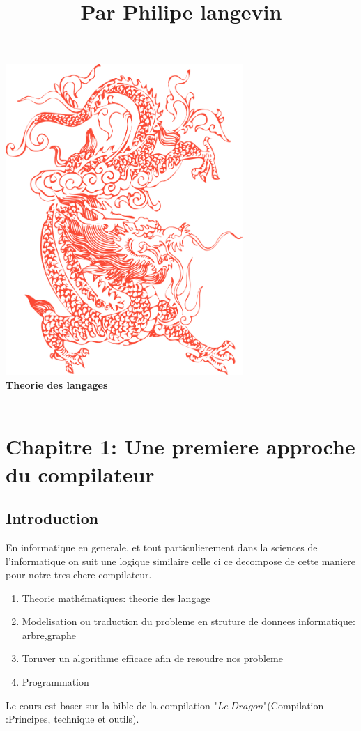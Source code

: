 \documentclass[a4paper,11pt]{article}
\title{\color{OrangeHaf} Par Philipe langevin}
\date{}
\begin{document}
\pagecolor{BlackHaf}
     \begin{center}
     \hfill\includegraphics[width=9cm]{dragon.png}\hspace*{\fill}
     \\
     \textbf{\color{OrangeHaf}\huge Theorie des langages}\\
     \\
     \end{center}
     \tableofcontents
    \section{\color{OrangeHaf} Chapitre 1: Une premiere approche du compilateur}
     \subsection{Introduction}
        En informatique en generale, et tout particulierement dans la sciences de l'informatique
        on suit une logique similaire celle ci ce decompose de cette maniere pour notre tres chere compilateur.
        \begin{enumerate}
            \item Theorie mathématiques: theorie des langage
            \item Modelisation ou traduction du probleme en struture de donnees informatique: arbre,graphe
            \item Toruver un algorithme efficace afin de resoudre nos probleme
            \item Programmation
        \end{enumerate}
        Le cours est baser sur la bible de la compilation "$Le\ Dragon$"(Compilation :Principes, technique et outils).
\end{document}
